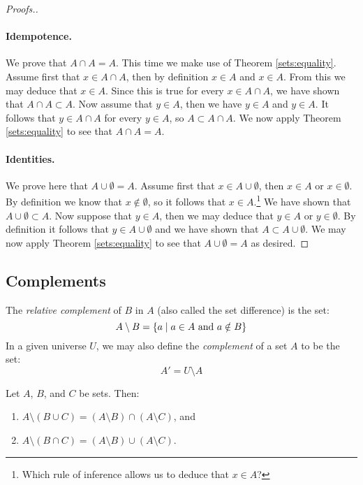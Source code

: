 \begin{proof}[Proofs.]
\paragraph{Idempotence.} We prove that $A\cap A=A$. This time we make use of Theorem \ref{sets:equality}. Assume first that $x\in A\cap A$, then by definition $x\in A$ and $x\in A$. From this we may deduce that $x\in A$. Since this is true for every $x\in A\cap A$, we have shown that $A\cap A\subset A$.  Now assume that $y\in A$, then we have $y\in A$ and $y\in A$. It follows that $y\in A\cap A$ for every $y\in A$, so $A\subset A\cap A$. We now apply Theorem \ref{sets:equality} to see that $A\cap A=A$.

\paragraph{Identities.} We prove here that $A\cup\emptyset=A$. Assume first that $x\in A\cup\emptyset$, then $x\in A$ or $x\in\emptyset$. By definition we know that $x\notin\emptyset$, so it follows that $x\in A$.\footnote{Which rule of inference allows us to deduce that $x\in A$?} We have shown that $A\cup\emptyset\subset A$. Now suppose that $y\in A$, then we may deduce that $y\in A$ or $y\in\emptyset$. By definition it follows that $y\in A\cup\emptyset$ and we have shown that $A\subset A\cup\emptyset$. We may now apply Theorem \ref{sets:equality} to see that $A\cup \emptyset=A$ as desired.
\end{proof}

\subsection{Complements}

\begin{definition}
The \emph{relative complement} of  $B$ in $A$ (also called the set difference) is the set: \[ A\setminus B=\{ a\mid a\in A \hbox{ and } a\notin B\}\]  In a given universe $U$, we may also define the \emph{complement} of a set $A$ to be the set: \[A'=U\setminus A\]
\end{definition}

\begin{thrm}[DeMorgan]\label{thrm:DeMorgan}
Let $A$, $B$, and $C$ be sets.  Then:
\begin{enumerate}
\item $A\setminus(B\cup C)=(A\setminus B)\cap(A\setminus C)$, and
\item $A\setminus(B\cap C)=(A\setminus B)\cup(A\setminus C)$.
\end{enumerate}
\end{thrm}

